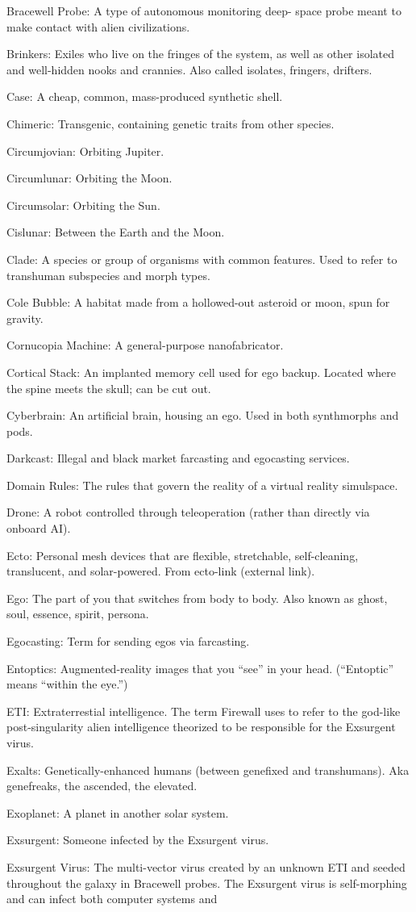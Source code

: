 Bracewell Probe: A type of autonomous monitoring deep- space probe meant to make contact with alien civilizations. \item Brinkers: Exiles who live on the fringes of the system, as well as other isolated and well-hidden nooks and crannies. Also called isolates, fringers, drifters. \item Case: A cheap, common, mass-produced synthetic shell. \item Chimeric: Transgenic, containing genetic traits from other species. \item Circumjovian: Orbiting Jupiter. \item Circumlunar: Orbiting the Moon. \item Circumsolar: Orbiting the Sun. \item Cislunar: Between the Earth and the Moon. \item Clade: A species or group of organisms with common features. Used to refer to transhuman subspecies and morph types. \item Cole Bubble: A habitat made from a hollowed-out asteroid or moon, spun for gravity. \item Cornucopia Machine: A general-purpose nanofabricator. \item Cortical Stack: An implanted memory cell used for ego backup. Located where the spine meets the skull; can be cut out. \item Cyberbrain: An artificial brain, housing an ego. Used in both synthmorphs and pods. \item Darkcast: Illegal and black market farcasting and egocasting services. \item Domain Rules: The rules that govern the reality of a virtual reality simulspace. \item Drone: A robot controlled through teleoperation (rather than directly via onboard AI). \item Ecto: Personal mesh devices that are flexible, stretchable, self-cleaning, translucent, and solar-powered. From ecto-link (external link). \item Ego: The part of you that switches from body to body. Also known as ghost, soul, essence, spirit, persona. \item Egocasting: Term for sending egos via farcasting. \item Entoptics: Augmented-reality images that you ``see'' in your head. (``Entoptic'' means ``within the eye.'') \item ETI: Extraterrestial intelligence. The term Firewall uses to refer to the god-like post-singularity alien intelligence theorized to be responsible for the Exsurgent virus. \item Exalts: Genetically-enhanced humans (between genefixed and transhumans). Aka genefreaks, the ascended, the elevated. \item Exoplanet: A planet in another solar system. \item Exsurgent: Someone infected by the Exsurgent virus. \item Exsurgent Virus: The multi-vector virus created by an unknown ETI and seeded throughout the galaxy in Bracewell probes. The Exsurgent virus is self-morphing and can infect both computer systems and 